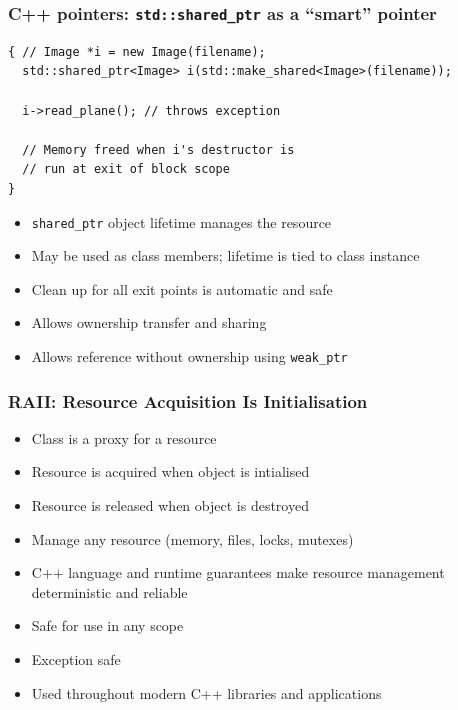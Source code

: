 \documentclass{beamer}
\begin{document}
\begin{frame}[fragile]
  \frametitle{C++ pointers: \texttt{std::shared\_ptr} as a “smart” pointer}
  \begin{lstlisting}
{ // Image *i = new Image(filename);
  std::shared_ptr<Image> i(std::make_shared<Image>(filename));

  i->read_plane(); // throws exception

  // Memory freed when i's destructor is
  // run at exit of block scope
}

\end{lstlisting}
  \begin{itemize}
    \item \texttt{shared\_ptr} object lifetime manages the resource
    \item May be used as class members; lifetime is tied to class instance
    \item Clean up for all exit points is automatic and safe
    \item Allows ownership transfer and sharing
    \item Allows reference without ownership using \texttt{weak\_ptr}
  \end{itemize}
\end{frame}

\begin{frame}[fragile]
  \frametitle{RAII: Resource Acquisition Is Initialisation}
    \begin{itemize}
    \item Class is a proxy for a resource
    \item Resource is acquired when object is intialised
    \item Resource is released when object is destroyed
    \item Manage any resource (memory, files, locks, mutexes)
    \item C++ language and runtime guarantees make resource management
      deterministic and reliable
    \item Safe for use in any scope
    \item Exception safe
    \item Used throughout modern C++ libraries and applications
    \end{itemize}
\end{frame}
\end{document}
